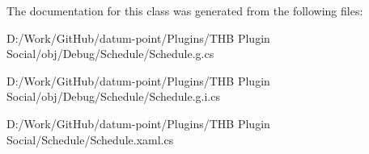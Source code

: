 The documentation for this class was generated from the following files\+:\begin{DoxyCompactItemize}
\item 
D\+:/\+Work/\+Git\+Hub/datum-\/point/\+Plugins/\+T\+H\+B Plugin Social/obj/\+Debug/\+Schedule/Schedule.\+g.\+cs\item 
D\+:/\+Work/\+Git\+Hub/datum-\/point/\+Plugins/\+T\+H\+B Plugin Social/obj/\+Debug/\+Schedule/Schedule.\+g.\+i.\+cs\item 
D\+:/\+Work/\+Git\+Hub/datum-\/point/\+Plugins/\+T\+H\+B Plugin Social/\+Schedule/Schedule.\+xaml.\+cs\end{DoxyCompactItemize}

